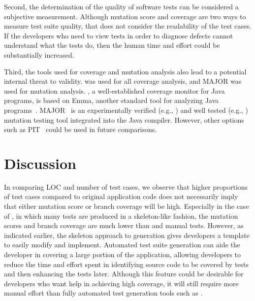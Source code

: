 Second, the determination of the quality of software tests can be considered a subjective measurement. Although mutation score and coverage are two ways to measure test suite quality, that does not consider the readability of the test cases.  If the developers who need to view tests in order to diagnose defects cannot understand what the tests do, then the human time and effort could be substantially increased.

Third, the tools used for coverage and mutation analysis also lead to a potential internal threat to validity.  \jacoco was used for all coverage analysis, and MAJOR was used for mutation analysis.  \jacoco, a well-established coverage monitor for Java programs, is based on Emma, another standard tool for analyzing Java programs~\cite{jacoco}.  MAJOR~\cite{just2011} is an experimentally verified (e.g., \cite{just2014}) and well tested (e.g., \cite{just2011b}) mutation testing tool integrated into the Java compiler. However, other options such as PIT~\cite{ pit2014} could be used in future comparisons. 



\section{Discussion}
\label{sec:discussion}

In comparing LOC and number of test cases, we observe that higher proportions of test cases compared to original application code does not necessarily imply that either mutation score or branch coverage will be high.  Especially in the case of \codepro, in which many tests are produced in a skeleton-like fashion, the mutation scores and branch coverage are much lower than  \evo and manual tests. However, as indicated earlier, the skeleton approach to generation gives developers a template to easily modify and implement. Automated test suite generation can aide the developer in covering a large portion of the application, allowing developers to reduce the time and effort spent in identifying source code to be covered by tests and then enhancing the tests later.  Although this feature could be desirable for developers who want help in achieving high coverage, it will still require more manual effort than fully automated test generation tools such as \evo.

